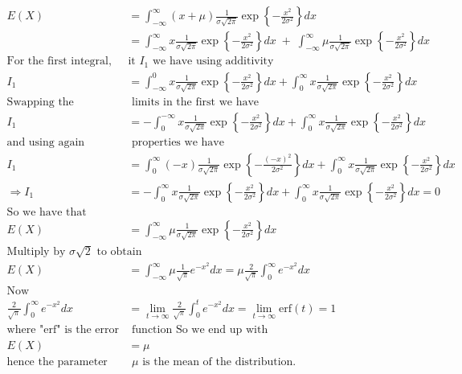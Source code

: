 \documentclass[10pt,a4paper]{article}
\begin{document}
\begin{align*}
E(X)& = \int_{-\infty}^{\infty}(x+\mu)\frac{1}{\sigma\sqrt{2\pi}}\exp\left\{-\frac{x^2}{2\sigma^2}\right\}dx\\
&=\int_{-\infty}^{\infty}x\frac{1}{\sigma\sqrt{2\pi}}\exp\left\{-\frac{x^2}{2\sigma^2}\right\}dx \;+\; \int_{-\infty}^{\infty}\mu\frac{1}{\sigma\sqrt{2\pi}}\exp\left\{-\frac{x^2}{2\sigma^2}\right\}dx\\
\textrm{For the first integral, call }& \textrm{it}\,\, I_1 \,\,\textrm{we have using additivity}\\
I_1& = \int_{-\infty}^0x\frac{1}{\sigma\sqrt{2\pi}}\exp\left\{-\frac{x^2}{2\sigma^2}\right\}dx + \int_{0}^{\infty}x\frac{1}{\sigma\sqrt{2\pi}}\exp\left\{-\frac{x^2}{2\sigma^2}\right\}dx\\
\textrm{Swapping the integration} & \textrm{ limits in the first we have}\\
I_1 &= -\int_{0}^{-\infty}x\frac{1}{\sigma\sqrt{2\pi}}\exp\left\{-\frac{x^2}{2\sigma^2}\right\}dx + \int_{0}^{\infty}x\frac{1}{\sigma\sqrt{2\pi}}\exp\left\{-\frac{x^2}{2\sigma^2}\right\}dx\\
\textrm{and using again integral} &\,\, \textrm{properties we have}\\
I_1& = \int_{0}^{\infty}(-x)\frac{1}{\sigma\sqrt{2\pi}}\exp\left\{-\frac{(-x)^2}{2\sigma^2}\right\}dx + \int_{0}^{\infty}x\frac{1}{\sigma\sqrt{2\pi}}\exp\left\{-\frac{x^2}{2\sigma^2}\right\}dx\\
\Rightarrow I_1 &= -\int_{0}^{\infty}x\frac{1}{\sigma\sqrt{2\pi}}\exp\left\{-\frac{x^2}{2\sigma^2}\right\}dx + \int_{0}^{\infty}x\frac{1}{\sigma\sqrt{2\pi}}\exp\left\{-\frac{x^2}{2\sigma^2}\right\}dx = 0\\
\textrm{So we have that}\qquad\qquad &\\
E(X)& = \int_{-\infty}^{\infty}\mu\frac{1}{\sigma\sqrt{2\pi}}\exp\left\{-\frac{x^2}{2\sigma^2}\right\}dx\\
\textrm{Multiply by}\,\, \sigma\sqrt{2} \,\,\textrm{to obtain}\\
E(X) &= \int_{-\infty}^{\infty}\mu\frac{1}{\sqrt{\pi}}e^{-x^2} dx = \mu\frac{2}{\sqrt{\pi}}\int_{0}^{\infty}e^{-x^2} dx\\
\textrm{Now}\qquad\qquad\qquad\qquad&\\
\frac{2}{\sqrt{\pi}}\int_{0}^{\infty}e^{-x^2} dx& = \lim_{t\rightarrow \infty}\frac{2}{\sqrt{\pi}}\int_{0}^{t}e^{-x^2} dx = \lim_{t\rightarrow \infty} \text{erf}(t) = 1\\
\textrm{where "erf" is the error}&\textrm{ function So we end up with}\\
E(X) &= \mu\\
\textrm{hence the parameter}&\,\, \mu\,\, \textrm{is the mean of the distribution.}
\end{align*}
\end{document}
